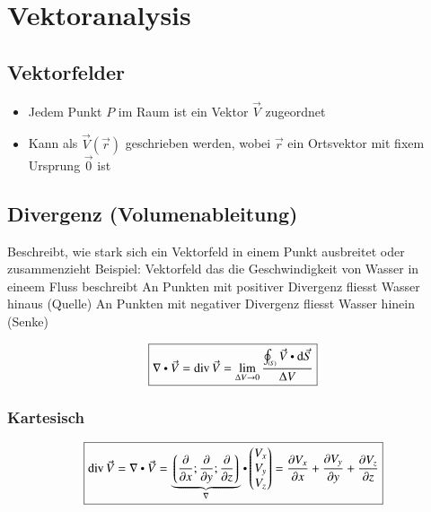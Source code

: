 \section{Vektoranalysis}

\subsection{Vektorfelder}
\begin{itemize}
    \item Jedem Punkt $P$ im Raum ist ein Vektor $\vec{V}$ zugeordnet
    \item Kann als $\vec{V}(\vec{r})$ geschrieben werden, wobei $\vec{r}$ ein Ortsvektor mit fixem Ursprung $\vec{0}$ ist
\end{itemize}


\subsection{Divergenz (Volumenableitung)}
\begin{outline}
    \1 Beschreibt, wie stark sich ein Vektorfeld in einem Punkt ausbreitet oder zusammenzieht
    \1 Beispiel: Vektorfeld das die Geschwindigkeit von Wasser in eineem Fluss beschreibt
        \2 An Punkten mit positiver Divergenz fliesst Wasser hinaus (Quelle)
        \2 An Punkten mit negativer Divergenz fliesst Wasser hinein (Senke)
\end{outline}

\[
    \boxed{\nabla\dotp\vec{V} = \div \vec{V} = \lim_{\Delta V\to 0}\frac{\oint_{\scriptscriptstyle (S)}\vec{V}\dotp\diff\vec{S}}{\Delta V}}
\]


\subsubsection{Kartesisch}
\[
    \boxed{%
        \div \vec{V}
        = \nabla\dotp\vec{V}
        = \underbrace{%
            \left\lgroup%
                \frac{\partial}{\partial x};\frac{\partial}{\partial y};\frac{\partial}{\partial z}%
            \right\rgroup}_{\nabla} \dotp 
        \begin{pmatrix}
            V_x \\ V_y \\ V_z
        \end{pmatrix}
        = \frac{\partial V_x}{\partial x} + \frac{\partial V_y}{\partial y} + \frac{\partial V_z}{\partial z}
    }
\]


